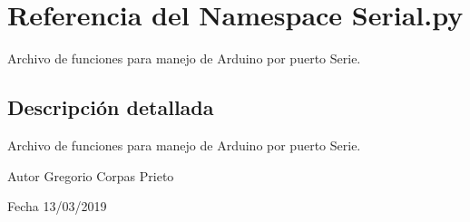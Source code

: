 \hypertarget{namespaceSerial_1_1py}{}\section{Referencia del Namespace Serial.\+py}
\label{namespaceSerial_1_1py}


Archivo de funciones para manejo de Arduino por puerto Serie.  




\subsection{Descripción detallada}
Archivo de funciones para manejo de Arduino por puerto Serie. 

\begin{DoxyAuthor}{Autor}
Gregorio Corpas Prieto 
\end{DoxyAuthor}
\begin{DoxyDate}{Fecha}
13/03/2019 
\end{DoxyDate}
